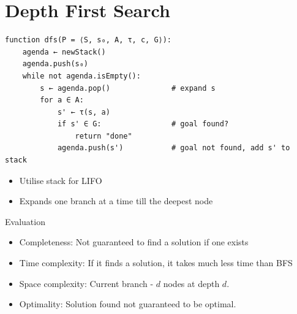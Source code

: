 \documentclass[12pt, a4paper]{article}
\begin{document}
\newpage

\section{Depth First Search}
\begin{algorithm}[H]
\end{algorithm}
\begin{Verbatim}
function dfs(P = ⟨S, s₀, A, τ, c, G⟩):
    agenda ← newStack()
    agenda.push(s₀)
    while not agenda.isEmpty():
        s ← agenda.pop()              # expand s
        for a ∈ A:
            s' ← τ(s, a)
            if s' ∈ G:                # goal found?
                return "done"
            agenda.push(s')           # goal not found, add s' to stack
\end{Verbatim}

\begin{itemize}
    \item Utilise stack for LIFO
    \item Expands one branch at a time till the deepest node
\end{itemize}

\noindent Evaluation
\begin{itemize}
    \item Completeness: Not guaranteed to find a solution if one exists
    \item Time complexity: If it finds a solution, it takes much less time than BFS
    \item Space complexity: Current branch - $d$ nodes at depth $d$.
    \item Optimality: Solution found not guaranteed to be optimal.
\end{itemize}

\newpage
\end{document}
